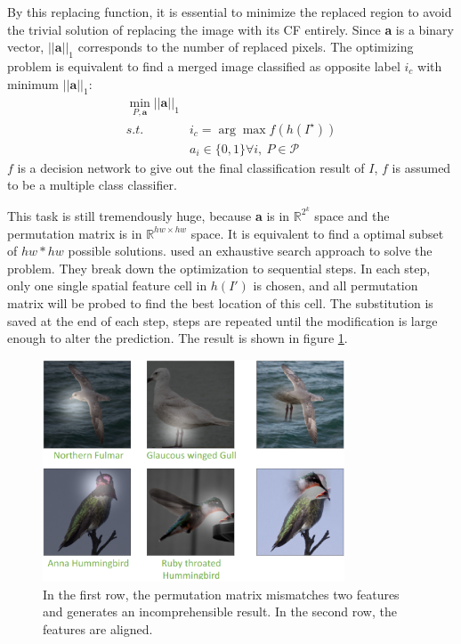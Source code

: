 By this replacing function, it is essential to minimize the replaced region to avoid the trivial solution of replacing the image with its CF  entirely. Since \textbf{a} is a binary vector, $||\textbf{a}||_1$ corresponds to the number of replaced pixels. The optimizing problem is equivalent to find a merged image classified as opposite label $i_c$ with minimum $||\textbf{a}||_1$:
\begin{equation}\label{eq:visualOpt}
\begin{split}
  \min_{P,\mathbf{a}} ||\mathbf{a}||_1
  \\s.t.\ &i_c=\arg\max f(h(I^\star))
  \\&a_i\in\{0,1\}\forall i,\ P\in \mathcal{P}
  \end{split}
\end{equation}
$f$ is a decision network to give out the final classification result of $I$, $f$ is assumed to be a multiple class classifier.

This task is still tremendously huge, because \textbf{a} is in $\mathbb{R}^{2^k}$ space and the permutation matrix is in $\mathbb{R}^{hw\times hw}$ space. It is equivalent to find a optimal subset of $hw*hw$ possible solutions. \cite{visualCounterfactual} used an exhaustive search approach to solve the problem. They break down the optimization to sequential steps. In each step, only one single spatial feature cell in $h(I')$ is chosen, and all permutation matrix will be probed to find the best location of this cell. The substitution is saved at the end of each step, steps are repeated until the modification is large enough to alter the prediction. The result is shown in figure \ref{fig:visualCF}.
\begin{figure}
  \centering
  \includegraphics[width=0.8\textwidth]{visualCFexample.PNG}
  \caption{In the first row, the permutation matrix mismatches two features and generates an incomprehensible result. In the second row, the features are aligned. 
  }\label{fig:visualCF}
\end{figure}
